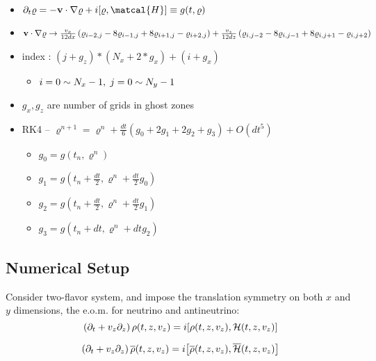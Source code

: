 \documentclass[11pt,a4paper]{article}
\begin{document}
\begin{itemize}
   \item $\partial _{t} \varrho = - \vb{v}\cdot \nabla \varrho + i \comm{\varrho}{\matcal{H}} \equiv g(t,  \varrho)$
   \item $\vb{v} \cdot \nabla \varrho \rightarrow \frac{v_{x}}{12 dx}\left(\varrho_{i-2,j} - 8\varrho_{i-1, j} + 8\varrho_{i+1, j} - \varrho_{i+2,j }\right) + \frac{v_{z}}{12dz} \left(  \varrho_{i,j-2} -8\varrho_{i,j-1} + 8\varrho_{i,j+1} -\varrho_{i,j+2} \right)$
   \item index : $(j+g_{z})*(N_{x} + 2*g_{x}) + (i+g_{x})$
   \begin{itemize}
      \item $i = 0 \sim  N_{x}-1, \hspace{0.1cm} j = 0 \sim N_{y}-1$
   \end{itemize}
   \item $g_{x}, g_{z}$ are number of grids in ghost zones
   \item RK4 -- $\varrho ^{n+1} = \varrho^{n} + \frac{dt}{6}\left( g_{0} + 2 g_{1} + 2g_{2} + g_{3}\right) + O(dt ^{5})$
        \begin{itemize}
           \item  $g_{0} = g(t_{n}, \varrho^{n})$
           \item $g_{1} = g(t_{n} + \frac{dt}{2}, \varrho^{n} + \frac{dt}{2}g_{0})$
           \item $g_{2} = g(t_{n} + \frac{dt}{2} , \varrho^{n} + \frac{dt}{2}g_{1})$
           \item $g_{3} = g(t_{n} + dt, \varrho^{n} + dt g_{2})$
        \end{itemize}
 \end{itemize}



\subsection{Numerical Setup}%
 \label{sub:Perturbation from an initial state}

 Consider two-flavor system, and impose the translation symmetry on both $x$ and $y$ dimensions, the e.o.m. for neutrino and antineutrino: 
\begin{equation*}
   \left(   \partial _{t} + v_{z}\partial_{z}\right)\rho(t,z,v_{z}) = i \comm{\rho(t,z,v_{z})}{\mathcal{H}(t,z,v_{z})}
\end{equation*}

\begin{equation*}
   \left(   \partial _{t} + v_{z}\partial_{z}\right)\overline{\rho}(t,z,v_{z}) = i \comm{\overline{\rho}(t,z,v_{z})}{\overline{\mathcal{H}}(t,z,v_{z})}
\end{equation*}
\end{document}
